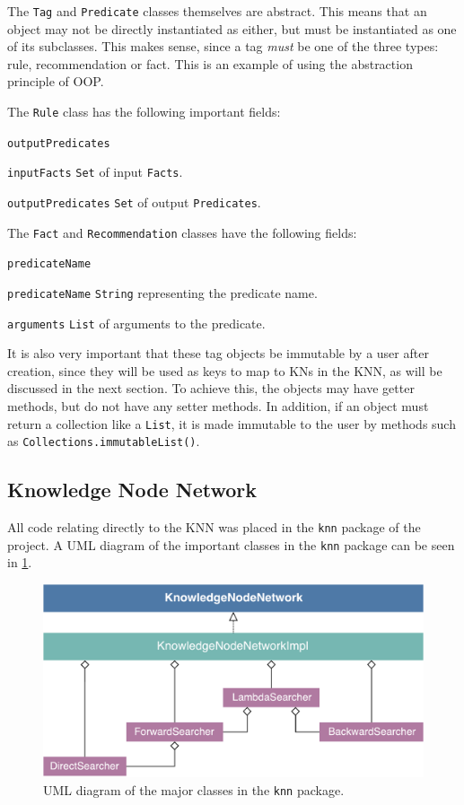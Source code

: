 \documentclass[titlepage,11pt]{article}
\newcommand{\code}[1]{\texttt{#1}}
\begin{document}
The \code{Tag} and \code{Predicate} classes themselves are abstract. This means that an object may not be directly instantiated as either, but must be instantiated as one of its subclasses. This makes sense, since a tag \emph{must} be one of the three types: rule, recommendation or fact. This is an example of using the abstraction principle of OOP.

The \code{Rule} class has the following important fields:

\begin{labeling}{\code{outputPredicates}}
	\item[\code{inputFacts}] \code{Set} of input \code{Facts}.
	\item[\code{outputPredicates}] \code{Set} of output \code{Predicates}.
\end{labeling}

The \code{Fact} and \code{Recommendation} classes have the following fields:

\begin{labeling}{\code{predicateName}}
	\item[\code{predicateName}] \code{String} representing the predicate name.
	\item[\code{arguments}] \code{List} of arguments to the predicate.
\end{labeling}

It is also very important that these tag objects be immutable by a user after creation, since they will be used as keys to map to KNs in the KNN, as will be discussed in the next section. To achieve this, the objects may have getter methods, but do not have any setter methods. In addition, if an object must return a collection like a \code{List}, it is made immutable to the user by methods such as \code{Collections.immutableList()}.

\subsection{Knowledge Node Network}

All code relating directly to the KNN was placed in the \code{knn} package of the project. A UML diagram of the important classes in the \code{knn} package can be seen in \cref{fig:uml_knn}.

\begin{figure}[!htb]
	\includegraphics[width=\columnwidth]{figures/uml_knn.pdf}
	\caption{UML diagram of the major classes in the \code{knn} package.}
	\label{fig:uml_knn}
\end{figure}
\end{document}
